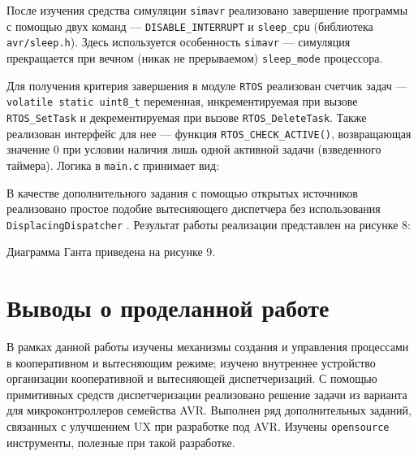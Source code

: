 После изучения средства симуляции \texttt{simavr} реализовано завершение программы с помощью двух команд — \texttt{DISABLE\_INTERRUPT} и \texttt{sleep\_cpu} (библиотека \linebreak \texttt{avr/sleep.h}). Здесь используется особенность \texttt{simavr} — симуляция прекращается при вечном (никак не прерываемом) \texttt{sleep\_mode} процессора.

Для получения критерия завершения в модуле \texttt{RTOS} реализован счетчик задач — \texttt{volatile static uint8\_t} переменная, инкрементируемая при вызове \texttt{RTOS\_SetTask} и декрементируемая при вызове \texttt{RTOS\_DeleteTask}. Также реализован интерфейс для нее — функция \texttt{RTOS\_CHECK\_ACTIVE()}, возвращающая значение 0 при условии наличия лишь одной активной задачи (взведенного таймера). Логика в \texttt{main.c} принимает вид:


В качестве дополнительного задания с помощью открытых источников реализовано простое подобие вытесняющего диспетчера без использования \linebreak \texttt{DisplacingDispatcher} \cite{qsnake}. Результат работы реализации представлен на рисунке 8:

\clearpage

Диаграмма Ганта приведена на рисунке 9.


\FloatBarrier
\clearpage

\section{Выводы о проделанной работе}
В рамках данной работы изучены механизмы создания и управления процессами в кооперативном и вытесняющим режиме; изучено внутреннее устройство организации кооперативной и вытесняющей диспетчеризаций. С помощью примитивных средств диспетчеризации реализовано решение задачи из варианта для микроконтроллеров семейства AVR. Выполнен ряд дополнительных заданий, связанных с улучшением UX при разработке под AVR. Изучены \texttt{opensource} инструменты, полезные при такой разработке.

\clearpage